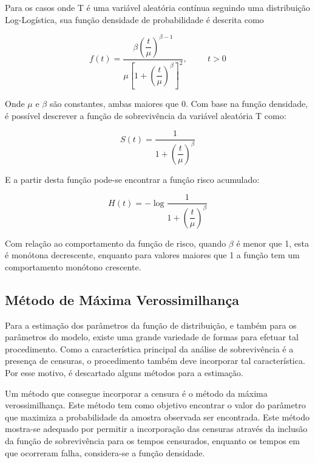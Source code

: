 \documentclass[a4paper,12pt]{article}
\begin{document}
Para os casos onde T é uma variável aleatória contínua seguindo uma distribuição Log-Logística, sua função densidade de probabilidade é descrita como

\begin{equation}
  f(t) = \dfrac{\beta\left(\dfrac{t}{\mu}\right)^{\beta - 1}}{\mu\left[1+\left(\dfrac{t}{\mu}\right)^{\beta}\right]^2}, \hspace{1cm} t > 0
\end{equation}

Onde $\mu$ e $\beta$ são constantes, ambas maiores que 0. Com base na função densidade, é possível descrever a função de sobrevivência da variável aleatória T como:

\begin{equation} \label{eq: LLSurv}
  S(t) = \dfrac{1}{1 + \left(\dfrac{t}{\mu}\right)^{\beta}}
\end{equation}

E a partir desta função pode-se encontrar a função risco acumulado:

\begin{equation} \label{eq: HazLL}
H(t) = - \log{\dfrac{1}{1 + \left(\dfrac{t}{\mu}\right)^{\beta}}}
\end{equation}

Com relação ao comportamento da função de risco, quando $\beta$ é menor que 1, esta é monótona decrescente, enquanto para valores maiores que 1 a função tem um comportamento monótono crescente.

\subsection{Método de Máxima Verossimilhança}

Para a estimação dos parâmetros da função de distribuição, e também para os parâmetros do modelo, existe uma grande variedade de formas para efetuar tal procedimento. Como a característica principal da análise de sobrevivência é a presença de censuras, o procedimento também deve incorporar tal característica. Por esse motivo, é descartado alguns métodos para a estimação.

Um método que consegue incorporar a censura é o método da máxima verossimilhança. Este método tem como objetivo encontrar o valor do parâmetro que maximiza a probabilidade da amostra observada ser encontrada. Este método mostra-se adequado por permitir a incorporação das censuras através da inclusão da função de sobrevivência para os tempos censurados, enquanto os tempos em que ocorreram falha, considera-se a função densidade.
\end{document}
